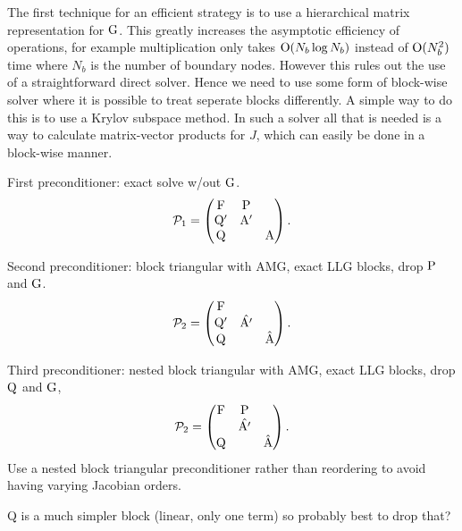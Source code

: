 The first technique for an efficient strategy is to use a hierarchical matrix representation for ${\mathbf{\mathrm{G}}}$.
This greatly increases the asymptotic efficiency of operations, for example multiplication only takes $\text{O}(N_b \log N_b)$ instead of $\text{O}(N_b^2)$ time where $N_b$ is the number of boundary nodes.
However this rules out the use of a straightforward direct solver.
Hence we need to use some form of block-wise solver where it is possible to treat seperate blocks differently.
A simple way to do this is to use a Krylov subspace method.
In such a solver all that is needed is a way to calculate matrix-vector products for $J$, which can easily be done in a block-wise manner.

\newcommand{\prcd}{\mathcal{P}}

First preconditioner: exact solve w/out ${\mathbf{\mathrm{G}}}$.
\begin{equation}
  \prcd_{1} = 
  \begin{pmatrix}
    \Fm       & \Pm     &  \\
    \Qm'       & \Am'    &   \\
    \Qm       &         &   \Am
  \end{pmatrix}.
\end{equation}

Second preconditioner: block triangular with AMG, exact LLG blocks, drop $\mathrm{P}$ and ${\mathbf{\mathrm{G}}}$.
\begin{equation}
  \prcd_{2} = 
  \begin{pmatrix}
    \Fm       &           &  \\
    \Qm'       & \hat{\Am'}&   \\
    \Qm       &           &   \hat{\Am}
  \end{pmatrix}.
\end{equation}

Third preconditioner: nested block triangular with AMG, exact LLG blocks, drop $\mathrm{Q}$ and ${\mathbf{\mathrm{G}}}$,
\begin{equation}
  \prcd_{2} = 
  \begin{pmatrix}
    \Fm       & \Pm       &  \\
              & \hat{\Am'}&   \\
    \Qm       &           &   \hat{\Am}
  \end{pmatrix}.
\end{equation}
Use a nested block triangular preconditioner rather than reordering to avoid having varying Jacobian orders.

Q is a much simpler block (linear, only one term) so probably best to drop that?

